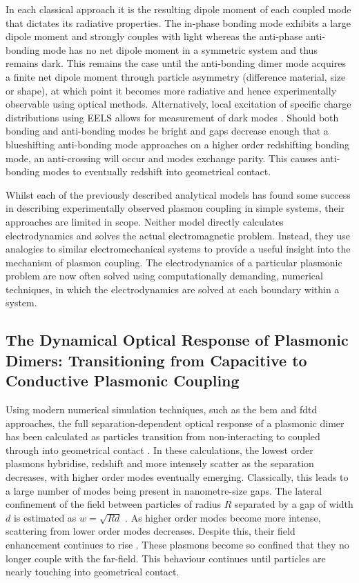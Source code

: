 \documentclass{article}
\begin{document}
In each classical approach it is the resulting dipole moment of each coupled mode that dictates its radiative properties. The in-phase bonding mode exhibits a large dipole moment and strongly couples with light whereas the anti-phase anti-bonding mode has no net dipole moment in a symmetric system and thus remains dark. This remains the case until the anti-bonding dimer mode acquires a finite net dipole moment through particle asymmetry (difference material, size or shape), at which point it becomes more radiative and hence experimentally observable using optical methods. Alternatively, local excitation of specific charge distributions using EELS allows for measurement of dark modes \cite{chu2008, koh2009}. Should both bonding and anti-bonding modes be bright and gaps decrease enough that a blueshifting anti-bonding mode approaches on a higher order redshifting bonding mode, an anti-crossing will occur and modes exchange parity. This causes anti-bonding modes to eventually redshift into geometrical contact.

Whilst each of the previously described analytical models has found some success in describing experimentally observed plasmon coupling in simple systems, their approaches are limited in scope. Neither model directly calculates electrodynamics and solves the actual electromagnetic problem. Instead, they use analogies to similar electromechanical systems to provide a useful insight into the mechanism of plasmon coupling. The electrodynamics of a particular plasmonic problem are now often solved using computationally demanding, numerical techniques, in which the electrodynamics are solved at each boundary within a system.

\FloatBarrier
\subsection{The Dynamical Optical Response of Plasmonic Dimers: Transitioning from Capacitive to Conductive Plasmonic Coupling}

Using modern numerical simulation techniques, such as the \gls{bem} and \gls{fdtd} approaches, the full separation-dependent optical response of a plasmonic dimer has been calculated as particles transition from non-interacting to coupled through into geometrical contact \cite{romero2006}. In these calculations, the lowest order plasmons hybridise, redshift and more intensely scatter as the separation decreases, with higher order modes eventually emerging. Classically, this leads to a large number of modes being present in nanometre-size gaps. The lateral confinement of the field between particles of radius $R$ separated by a gap of width $d$ is estimated as $w=\sqrt{Rd}$ \cite{romero2006}. As higher order modes become more intense, scattering from lower order modes decreases. Despite this, their field enhancement continues to rise \cite{esteban2012}. These plasmons become so confined that they no longer couple with the far-field. This behaviour continues until particles are nearly touching into geometrical contact. %
\end{document}
